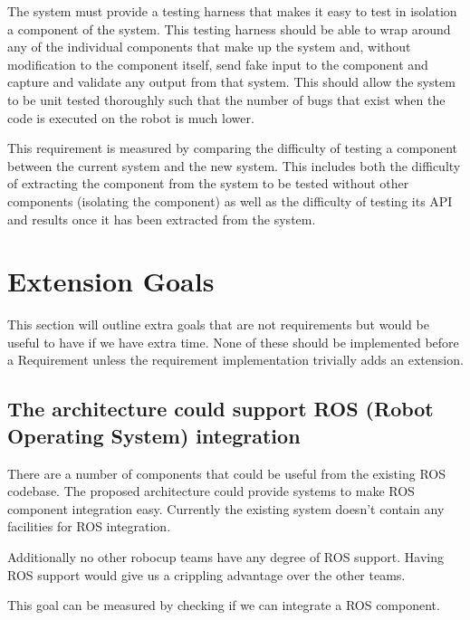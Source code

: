 \documentclass[english,12pt]{scrartcl}
\begin{document}
			The system must provide a testing harness that makes it easy to test in isolation a
			component of the system. This testing harness should be able to wrap around any of the
			individual components that make up the system and, without modification to the component
			itself, send fake input to the component and capture and validate any output from that
			system. This should allow the system to be unit tested thoroughly such that the number
			of bugs that exist when the code is executed on the robot is much lower.

			This requirement is measured by comparing the difficulty of testing a component between
			the current system and the new system. This includes both the difficulty of extracting
			the component from the system to be tested without other components (isolating the
			component) as well as the difficulty of testing its API and results once it has been
			extracted from the system.

	\section{Extension Goals}
		This section will outline extra goals that are not requirements but would be useful to have
		if we have extra time. None of these should be implemented before a Requirement unless the
		requirement implementation trivially adds an extension.

		\subsection{The architecture could support ROS (Robot Operating System) integration}
			There are a number of components that could be useful from the existing ROS codebase.
			The proposed architecture could provide systems to make ROS component integration easy.
			Currently the existing system doesn't contain any facilities for ROS integration.

			Additionally no other \gls{robocup} teams have any degree of ROS support. Having ROS support
			would give us a crippling advantage over the other teams.

			This goal can be measured by checking if we can integrate a ROS component.


	
	
	
	\printglossaries
\end{document}
